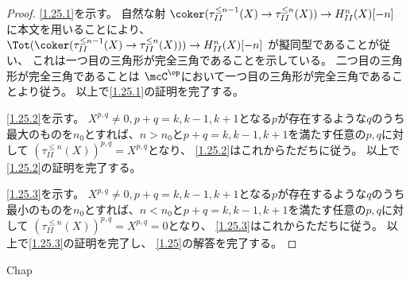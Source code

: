 \documentclass[uplatex,dvipdfmx]{jsarticle}
\begin{document}
\begin{proof}
  \ref{1.25.1}を示す。
  自然な射
  \(\coker(\tau_{II}^{\leq n-1}(X) \to \tau_{II}^{\leq n}(X))\to H_{II}^n(X)[-n]\)
  に本文\cite[Proposition 1.9.3]{kashiwara2002sheaves}を用いることにより、
  \(\Tot(\coker(\tau_{II}^{\leq n-1}(X) \to \tau_{II}^{\leq n}(X)))\to H_{II}^n(X)[-n]\)
  が擬同型であることが従い、
  これは一つ目の三角形が完全三角であることを示している。
  二つ目の三角形が完全三角であることは
  \(\mcC^{\op}\)において一つ目の三角形が完全三角であることより従う。
  以上で\ref{1.25.1}の証明を完了する。

  \ref{1.25.2}を示す。
  \(X^{p,q}\neq 0, p+q=k,k-1,k+1\)となる\(p\)が存在するような\(q\)のうち
  最大のものを\(n_0\)とすれば、\(n > n_0\)と\(p+q=k,k-1,k+1\)を満たす任意の\(p,q\)に対して
  \((\tau_{II}^{\leq n}(X))^{p,q} = X^{p,q}\)となり、
  \ref{1.25.2}はこれからただちに従う。
  以上で\ref{1.25.2}の証明を完了する。

  \ref{1.25.3}を示す。
  \(X^{p,q}\neq 0, p+q=k,k-1,k+1\)となる\(p\)が存在するような\(q\)のうち
  最小のものを\(n_0\)とすれば、\(n < n_0\)と\(p+q=k,k-1,k+1\)を満たす任意の\(p,q\)に対して
  \((\tau_{II}^{\leq n}(X))^{p,q} = X^{p,q} = 0\)となり、
  \ref{1.25.3}はこれからただちに従う。
  以上で\ref{1.25.3}の証明を完了し、
  \autoref{1.25}の解答を完了する。
\end{proof}




\ifcsname Chap\endcsname\else
\printbibliography
\end{document}
